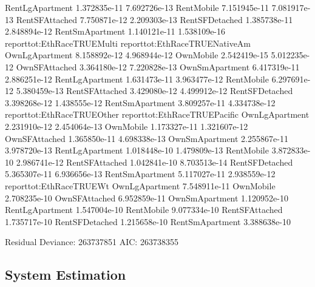 \documentclass{article}
\begin{document}
\begin{Schunk}
\begin{Soutput}
RentLgApartment              1.372835e-11               7.692726e-13
RentMobile                   7.151945e-11               7.081917e-13
RentSFAttached               7.750871e-12               2.209303e-13
RentSFDetached               1.385738e-11               2.848894e-12
RentSmApartment              1.140121e-11               1.538109e-16
                reporttot:EthRaceTRUEMulti reporttot:EthRaceTRUENativeAm
OwnLgApartment                8.158892e-12                  4.968944e-12
OwnMobile                     2.542419e-15                  5.012235e-12
OwnSFAttached                 3.364180e-12                  7.220828e-13
OwnSmApartment                6.417319e-11                  2.886251e-12
RentLgApartment               1.631473e-11                  3.963477e-12
RentMobile                    6.297691e-12                  5.380459e-13
RentSFAttached                3.429080e-12                  4.499912e-12
RentSFDetached                3.398268e-12                  1.438555e-12
RentSmApartment               3.809257e-11                  4.334738e-12
                reporttot:EthRaceTRUEOther reporttot:EthRaceTRUEPacific
OwnLgApartment                2.231910e-12                 2.454064e-13
OwnMobile                     1.173327e-11                 1.321607e-12
OwnSFAttached                 1.365850e-11                 4.698338e-13
OwnSmApartment                2.255867e-11                 3.978720e-13
RentLgApartment               1.018448e-10                 1.479809e-13
RentMobile                    3.872833e-10                 2.986741e-12
RentSFAttached                1.042841e-10                 8.703513e-14
RentSFDetached                5.365307e-11                 6.936656e-13
RentSmApartment               5.117027e-11                 2.938559e-12
                reporttot:EthRaceTRUEWt
OwnLgApartment             7.548911e-11
OwnMobile                  2.708235e-10
OwnSFAttached              6.952859e-11
OwnSmApartment             1.120952e-10
RentLgApartment            1.547004e-10
RentMobile                 9.077334e-10
RentSFAttached             1.735717e-10
RentSFDetached             1.215658e-10
RentSmApartment            3.388638e-10

Residual Deviance: 263737851 
AIC: 263738355 
\end{Soutput}
\end{Schunk}





  \subsection{System Estimation}
\end{document}
